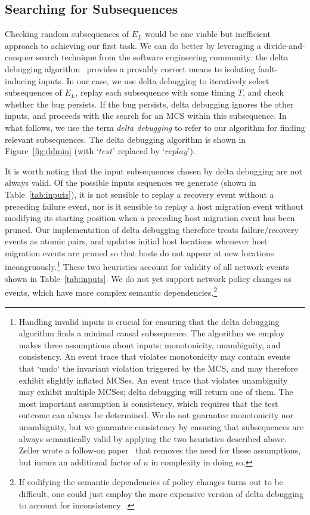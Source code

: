 \subsection{Searching for Subsequences}
\label{subsec:delta_debugging}

Checking random subsequences of $E_L$ would be one viable but inefficient
approach to achieving our first task. We can do better by leveraging a
divide-and-conquer search technique from the software engineering community:
the delta
debugging algorithm~\cite{Zeller:1999:YMP:318773.318946} provides a provably
correct means to isolating fault-inducing inputs. In our case, we use delta
debugging to iteratively select subsequences of $E_L$, replay each
subsequence with
some timing $T$, and check whether the bug persists. If the bug persists,
delta debugging ignores the
other inputs, and proceeds with the search for an MCS within this subsequence.
In what follows, we use the term {\em delta debugging} to refer to our algorithm for finding relevant subsequences.
The delta debugging algorithm is shown in
Figure~\ref{fig:ddmin} (with `$test$' replaced by `$replay$').

It is worth noting that the input subsequences chosen by delta debugging are not always
valid. Of the possible inputs sequences we generate (shown in
Table~\ref{tab:inputs}), it is not sensible to replay a recovery event without a
preceding failure event, nor is it sensible to replay a host migration
event without modifying its starting position when a preceding host
migration event has been pruned. Our implementation of delta debugging therefore treats
failure/recovery events as atomic pairs, and updates initial host locations
whenever host migration events are pruned so that hosts do not appear at new
locations incongruously.\footnote{Handling invalid inputs is crucial for
ensuring that the delta debugging algorithm finds a minimal causal
subsequence. The algorithm we employ~\cite{Zeller:1999:YMP:318773.318946}
makes three
assumptions about inputs: monotonicity, unambiguity, and consistency.
An event trace that violates monotonicity may contain events that `undo` the
invariant violation triggered by the MCS, and may therefore exhibit slightly
inflated MCSes. An event trace that violates unambiguity may exhibit multiple MCSes; delta debugging
will return one of them. The most important assumption is consistency, which
requires that the test outcome can always be determined.
We do not
guarantee monotonicity nor unambiguity, but we guarantee consistency by
ensuring that subsequences are always semantically valid by applying the two
heuristics described above. Zeller wrote a follow-on
paper~\cite{Zeller:2002:SIF:506201.506206} that removes the need for these
assumptions, but incurs an additional factor of $n$ in complexity in doing so. }
These two heuristics account for validity of all network
events shown in Table~\ref{tab:inputs}. We do not yet
support network policy changes as events, which have more complex semantic
dependencies.\footnote{If codifying the semantic dependencies of
policy changes turns out to be difficult, one could just employ the more
expensive version of delta debugging to account for
inconsistency~\cite{Zeller:2002:SIF:506201.506206}.}

